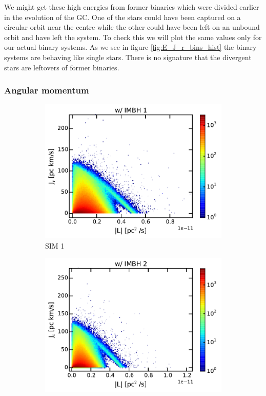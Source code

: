 \par We might get these high energies from former binaries which were divided earlier in the evolution of the \ac{GC}. One of the stars could have been captured on a circular orbit near the centre while the other could have been left on an unbound orbit and have left the system. To check this we will plot the same values only for our actual binary systems. As we see in figure \ref{fig:E_J_r_bins_hist} the binary systems are behaving like single stars. There is no signature that the divergent stars are leftovers of former binaries. 

\subsubsection{Angular momentum}
\begin{figure}[htbp]
\centering
	\begin{subfigure}{0.475\textwidth}
		\includegraphics[width=\textwidth]{Plots/L_J_r_hist_IMBH1.pdf}
		\caption{SIM 1}
		\label{fig:L_J_r_hist_IMBH1}
	\end{subfigure}
	\hfill
	\begin{subfigure}{0.475\textwidth}
		\includegraphics[width=\textwidth]{Plots/L_J_r_hist_IMBH2.pdf}

\end{subfigure}
\end{figure}

